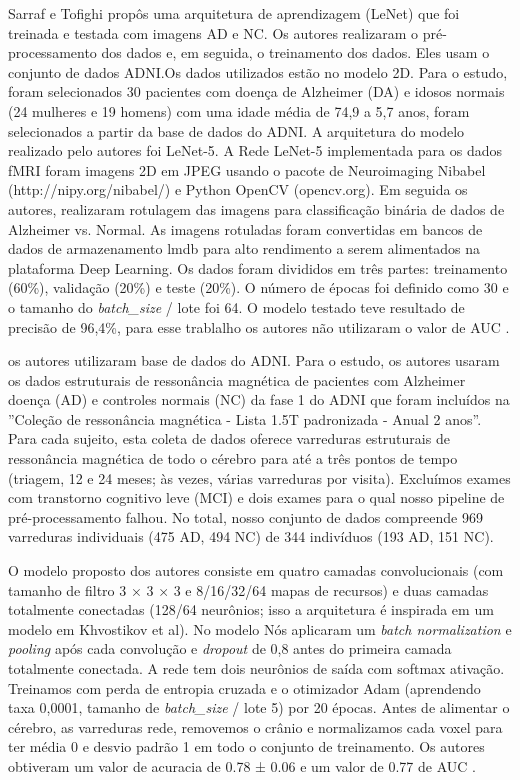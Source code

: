\documentclass[openright]{UFRGS} %
\begin{document}
Sarraf e Tofighi propôs uma arquitetura de aprendizagem (LeNet) que foi treinada e testada com imagens AD e NC. Os autores realizaram o pré-processamento dos dados e, em seguida, o treinamento dos dados. Eles usam o conjunto de dados ADNI.Os dados utilizados estão no modelo 2D. 
Para o estudo, foram selecionados 30 pacientes com doença de Alzheimer (DA) e
idosos normais (24 mulheres e 19 homens)  com
uma idade média de 74,9 a 5,7 anos,  foram selecionados a partir da base de dados do ADNI.
A arquitetura do modelo realizado pelo autores foi LeNet-5. A Rede LeNet-5 implementada para  os dados fMRI  foram imagens 2D em JPEG usando o pacote de Neuroimaging Nibabel (http://nipy.org/nibabel/) e Python OpenCV
(opencv.org). Em seguida os autores, realizaram rotulagem  das imagens  para classificação binária de dados de Alzheimer vs. Normal. As imagens rotuladas foram convertidas em bancos de dados de armazenamento lmdb para alto rendimento a serem alimentados na plataforma Deep Learning.
Os dados foram divididos em três partes: treinamento
(60\%), validação (20\%) e teste (20\%). O número de
épocas foi definido como 30 e o tamanho do \textit{batch\_size }/ lote foi 64. O modelo testado  teve resultado de precisão de 96,4\%, para esse trablalho os autores não utilizaram o valor de AUC \cite{sarraf2016classification}.

 
\cite{rieke2018visualizing}  os autores utilizaram base de dados do ADNI. Para o estudo, os autores usaram os dados estruturais de ressonância magnética de pacientes com Alzheimer doença (AD) e controles normais (NC) da fase 1 do ADNI que foram incluídos
na ”Coleção de ressonância magnética - Lista 1.5T padronizada - Anual 2 anos”. Para cada
sujeito, esta coleta de dados oferece varreduras estruturais de ressonância magnética de todo o cérebro para até a três pontos de tempo (triagem, 12 e 24 meses; às vezes, várias varreduras
por visita). Excluímos exames com transtorno cognitivo leve (MCI) e dois exames
para o qual nosso pipeline de pré-processamento falhou. No total, nosso conjunto de dados compreende 969
varreduras individuais (475 AD, 494 NC) de 344 indivíduos (193 AD, 151 NC).
  
O  modelo proposto dos autores consiste em quatro camadas convolucionais (com tamanho de filtro 3 × 3 × 3 e
8/16/32/64 mapas de recursos) e duas camadas totalmente conectadas (128/64 neurônios; isso
a arquitetura é inspirada em um modelo em Khvostikov et al). No modelo Nós aplicaram um \textit{batch normalization}  e \textit{pooling} após cada convolução e \textit{dropout} de 0,8 antes do
primeira camada totalmente conectada. A rede tem dois neurônios de saída com softmax
ativação. Treinamos com perda de entropia cruzada e o otimizador Adam (aprendendo
taxa 0,0001, tamanho de \textit{batch\_size }/ lote 5) por 20 épocas. Antes de alimentar o cérebro, as varreduras
rede, removemos o crânio e normalizamos cada voxel para ter média 0 e
desvio padrão 1 em todo o conjunto de treinamento. Os autores obtiveram um valor de acuracia de
0.78 ± 0.06 e um valor de  0.77 de AUC \cite{rieke2018visualizing}. 
\end{document}
